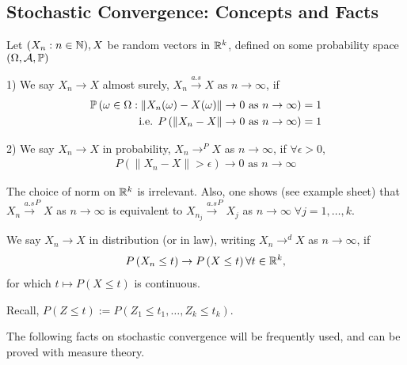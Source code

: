 \documentclass[a4paper]{article}
\begin{document}
\newpage

\subsection*{Stochastic Convergence: Concepts and Facts}

\begin{defn}
	Let $(X_n: n \in \N), X$ be random vectors in $\R^{k}$, defined on some probability space $(\Omega, \mathcal{A}, \P )$

		1) We say $X_n\to X$ almost surely, $X_n \stackrel{a.s}{\to} X \text{ as } n\to \infty$, if
		\begin{align*}
			\P\left(\omega \in \Omega : \|X_n (\omega) - X(\omega)\| \to 0 \text{ as } n\to \infty \right) &= 1 \\
			\text{ i.e. }P\left(\|X_n - X\| \to  0 \text{ as } n\to \infty\right) &=1
		\end{align*}

		2) We say $X_n \to  X$ in probability, $X_n \to ^{P} X$ as $n\to \infty$, if $\forall \epsilon > 0$,
		\begin{align*}
			P\left( \|X_n - X\| > \epsilon\right) \to 0 \text{ as } n \to \infty
		\end{align*}
		
\end{defn}

\begin{remark}
	The choice of norm on $\R^{k}$ is irrelevant. Also, one shows (see example sheet) that $X_n \stackrel{a.s}{\to}^{P} X$ as $n\to \infty$ is equivalent to $X_{n_{j}} \stackrel{a.s}{\to } ^{P} X_j $ as $n\to \infty \; \forall j = 1, \ldots, k$.
\end{remark}

\begin{defn}
	We say $X_n \to X$ in distribution (or in law), writing $X_n \to ^{d} X$ as $n \to \infty$, if
	\begin{align*}
		P\left(X_n \le t\right) \to P\left( X \le t \right) \forall t \in \R^{k}
	,\end{align*}
	for which $t \mapsto P\left( X \le t \right) $ is continuous.
\end{defn}

Recall, $P( Z\le t) := P\left( Z_1 \le t_1, \ldots, Z_k \le t_k \right).$

The following facts on stochastic convergence will be frequently used, and can be proved with measure theory.
\end{document}
